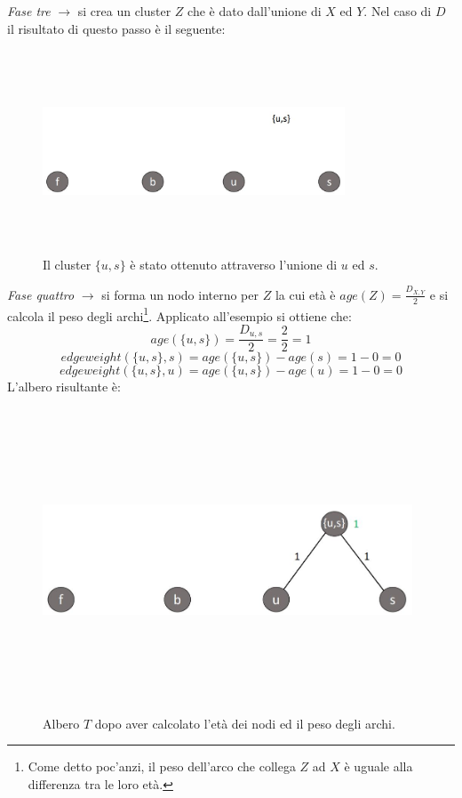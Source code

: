 \newline
\textit{Fase tre} $\rightarrow$ si crea un cluster $Z$ che è dato dall'unione di $X$ ed $Y$. Nel caso di $D$ il risultato di questo passo è il seguente:
\newpage
\begin{figure}[h!]
\centering
	\includegraphics[height=6cm, width=9cm,keepaspectratio]{rooted_upgma_3.jpg}
 	\caption{Il cluster $\{u, s\}$ è stato ottenuto attraverso l'unione di $u$ ed $s$.}
  	\label{fig:rooted_upgma_3}
\end{figure}
\textit{Fase quattro} $\rightarrow$ si forma un nodo interno per $Z$ la cui età è $age(Z)=\frac{D_{X,Y}}{2}$ e si calcola il peso degli archi\footnote{Come detto poc'anzi, il peso dell'arco che collega $Z$ ad $X$ è uguale alla differenza tra le loro età.}. Applicato all'esempio si ottiene che:
\[age(\{u, s\})=\frac{D_{u,s}}{2}=\frac{2}{2}=1\]
\[edgeweight(\{u, s\},s)=age(\{u, s\})-age(s)=1-0=0\]
\[edgeweight(\{u, s\},u)=age(\{u, s\})-age(u)=1-0=0\]
L'albero risultante è:
\begin{figure}[h!]
\centering
	\includegraphics[height=9cm, width=11cm,keepaspectratio]{rooted_upgma_4.jpg}
 	\caption{Albero $T$ dopo aver calcolato l'età dei nodi ed il peso degli archi.}
  	\label{fig:rooted_upgma_4}
\end{figure}
